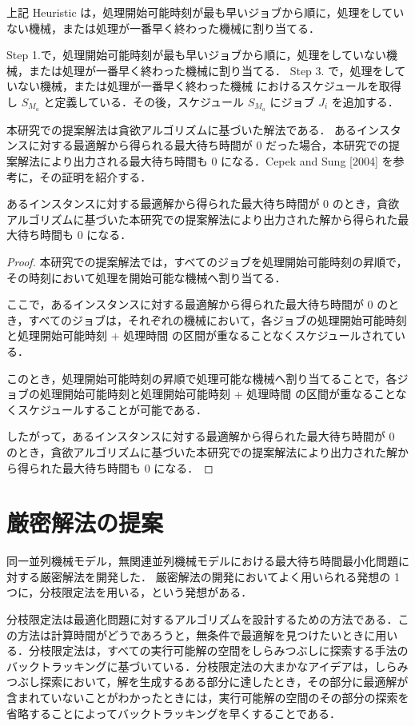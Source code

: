 \documentclass[12pt]{optlab-bachelor}
\begin{document}
上記 {\sc Heuristic} は，処理開始可能時刻が最も早いジョブから順に，処理をしていない機械，または処理が一番早く終わった機械に割り当てる．

Step 1.で，処理開始可能時刻が最も早いジョブから順に，処理をしていない機械，または処理が一番早く終わった機械に割り当てる．
Step 3. で，処理をしていない機械，または処理が一番早く終わった機械 におけるスケジュールを取得し $S_{M_a}$ と定義している．その後，スケジュール $S_{M_a}$ にジョブ $J_i$ を追加する．

本研究での提案解法は貪欲アルゴリズムに基づいた解法である．
あるインスタンスに対する最適解から得られる最大待ち時間が 0 だった場合，本研究での提案解法により出力される最大待ち時間も 0 になる．Cepek and Sung [2004] \cite{JIT} を参考に，その証明を紹介する．

\begin{lemma}
  あるインスタンスに対する最適解から得られた最大待ち時間が $0$ のとき，貪欲アルゴリズムに基づいた本研究での提案解法により出力された解から得られた最大待ち時間も $0$ になる．
\end{lemma}

\begin{proof}
  本研究での提案解法では，すべてのジョブを処理開始可能時刻の昇順で，その時刻において処理を開始可能な機械へ割り当てる．

  ここで，あるインスタンスに対する最適解から得られた最大待ち時間が 0 のとき，すべてのジョブは，それぞれの機械において，各ジョブの処理開始可能時刻と処理開始可能時刻 + 処理時間 の区間が重なることなくスケジュールされている．

  このとき，処理開始可能時刻の昇順で処理可能な機械へ割り当てることで，各ジョブの処理開始可能時刻と処理開始可能時刻 + 処理時間 の区間が重なることなくスケジュールすることが可能である．

  したがって，あるインスタンスに対する最適解から得られた最大待ち時間が 0 のとき，貪欲アルゴリズムに基づいた本研究での提案解法により出力された解から得られた最大待ち時間も 0 になる．
\end{proof}

\section{厳密解法の提案}\label{5_s_2}
同一並列機械モデル，無関連並列機械モデルにおける最大待ち時間最小化問題に対する厳密解法を開発した．
厳密解法の開発においてよく用いられる発想の 1 つに，分枝限定法を用いる，という発想がある．

分枝限定法は最適化問題に対するアルゴリズムを設計するための方法である．この方法は計算時間がどうであろうと，無条件で最適解を見つけたいときに用いる．分枝限定法は，すべての実行可能解の空間をしらみつぶしに探索する手法のバックトラッキングに基づいている．分枝限定法の大まかなアイデアは，しらみつぶし探索において，解を生成するある部分に達したとき，その部分に最適解が含まれていないことがわかったときには，実行可能解の空間のその部分の探索を省略することによってバックトラッキングを早くすることである．
\end{document}
